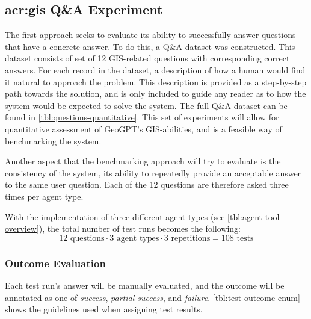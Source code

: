 \subsection[GIS Q\&A Experiment]{\acrshort{acr:gis} Q\&A Experiment}
\label{subsec:benchmarking-setup}

The first approach seeks to evaluate its ability to successfully answer questions that have a concrete answer. To do this, a Q\&A dataset was constructed. This dataset consists of set of 12 GIS-related questions with corresponding correct answers. For each record in the dataset, a description of how a human would find it natural to approach the problem. This description is provided as a step-by-step path towards the solution, and is only included to guide any reader as to how the system would be expected to solve the system. The full Q\&A dataset can be found in \autoref{tbl:questions-quantitative}. This set of experiments will allow for quantitative assessment of GeoGPT's GIS-abilities, and is a feasible way of benchmarking the system.

Another aspect that the benchmarking approach will try to evaluate is the consistency of the system, its ability to repeatedly provide an acceptable answer to the same user question. Each of the 12 questions are therefore asked three times per agent type.

With the implementation of three different agent types (see \autoref{tbl:agent-tool-overview}), the total number of test runs becomes the following: $$12 \text{ questions} \cdot 3 \text{ agent types} \cdot 3 \text{ repetitions} = 108 \text{ tests}$$


\subsubsection{Outcome Evaluation}

Each test run's answer will be manually evaluated, and the outcome will be annotated as one of \textit{success}, \textit{partial success}, and \textit{failure}. \autoref{tbl:test-outcome-enum} shows the guidelines used when assigning test results.

